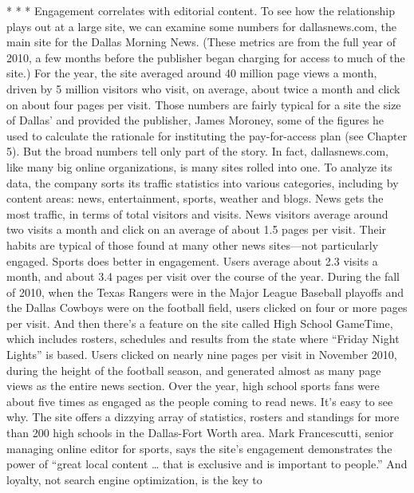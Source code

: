 * * *
Engagement correlates with editorial content. To see how the relationship plays
out at a large site, we can examine some numbers for dallasnews.com, the main
site for the Dallas Morning News. (These metrics are from the full year of 2010,
a few months before the publisher began charging for access to much of the site.)
For the year, the site averaged around 40 million page views a month, driven
by 5 million visitors who visit, on average, about twice a month and click on
about four pages per visit. Those numbers are fairly typical for a site the size of
Dallas’ and provided the publisher, James Moroney, some of the figures he used
to calculate the rationale for instituting the pay-for-access plan (see Chapter 5).
But the broad numbers tell only part of the story. In fact, dallasnews.com, like
many big online organizations, is many sites rolled into one. To analyze its data,
the company sorts its traffic statistics into various categories, including by content
areas: news, entertainment, sports, weather and blogs.
News gets the most traffic, in terms of total visitors and visits. News visitors
average around two visits a month and click on an average of about 1.5 pages
per visit. Their habits are typical of those found at many other news sites—not
particularly engaged.
Sports does better in engagement. Users average about 2.3 visits a month, and
about 3.4 pages per visit over the course of the year. During the fall of 2010,
when the Texas Rangers were in the Major League Baseball playoffs and the
Dallas Cowboys were on the football field, users clicked on four or more pages
per visit.
And then there’s a feature on the site called High School GameTime, which
includes rosters, schedules and results from the state where ``Friday Night Lights''
is based. Users clicked on nearly nine pages per visit in November 2010, during
the height of the football season, and generated almost as many page views as the
entire news section. Over the year, high school sports fans were about five times
as engaged as the people coming to read news.
It’s easy to see why. The site offers a dizzying array of statistics, rosters and
standings for more than 200 high schools in the Dallas-Fort Worth area. Mark
Francescutti, senior managing online editor for sports, says the site’s engagement
demonstrates the power of ``great local content … that is exclusive and is
important to people.'' And loyalty, not search engine optimization, is the key to
